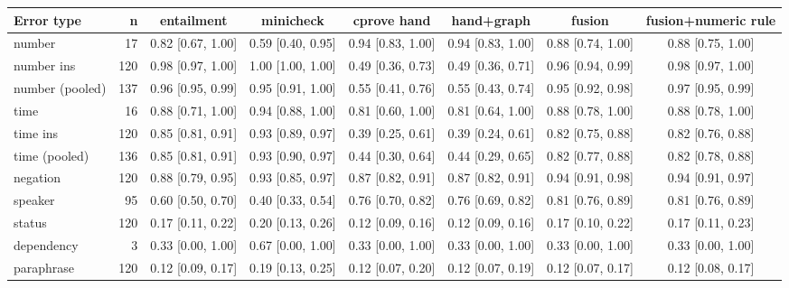 \begin{tabular}{@{}lrcccccc@{}}\toprule Error type & n & entailment & minicheck & cprove hand & hand+graph & fusion & fusion+numeric rule \\ \midrule
number & 17 & 0.82 [0.67, 1.00] & 0.59 [0.40, 0.95] & 0.94 [0.83, 1.00] & 0.94 [0.83, 1.00] & 0.88 [0.74, 1.00] & 0.88 [0.75, 1.00] \\
number ins & 120 & 0.98 [0.97, 1.00] & 1.00 [1.00, 1.00] & 0.49 [0.36, 0.73] & 0.49 [0.36, 0.71] & 0.96 [0.94, 0.99] & 0.98 [0.97, 1.00] \\
number (pooled) & 137 & 0.96 [0.95, 0.99] & 0.95 [0.91, 1.00] & 0.55 [0.41, 0.76] & 0.55 [0.43, 0.74] & 0.95 [0.92, 0.98] & 0.97 [0.95, 0.99] \\
time & 16 & 0.88 [0.71, 1.00] & 0.94 [0.88, 1.00] & 0.81 [0.60, 1.00] & 0.81 [0.64, 1.00] & 0.88 [0.78, 1.00] & 0.88 [0.78, 1.00] \\
time ins & 120 & 0.85 [0.81, 0.91] & 0.93 [0.89, 0.97] & 0.39 [0.25, 0.61] & 0.39 [0.24, 0.61] & 0.82 [0.75, 0.88] & 0.82 [0.76, 0.88] \\
time (pooled) & 136 & 0.85 [0.81, 0.91] & 0.93 [0.90, 0.97] & 0.44 [0.30, 0.64] & 0.44 [0.29, 0.65] & 0.82 [0.77, 0.88] & 0.82 [0.78, 0.88] \\
negation & 120 & 0.88 [0.79, 0.95] & 0.93 [0.85, 0.97] & 0.87 [0.82, 0.91] & 0.87 [0.82, 0.91] & 0.94 [0.91, 0.98] & 0.94 [0.91, 0.97] \\
speaker & 95 & 0.60 [0.50, 0.70] & 0.40 [0.33, 0.54] & 0.76 [0.70, 0.82] & 0.76 [0.69, 0.82] & 0.81 [0.76, 0.89] & 0.81 [0.76, 0.89] \\
status & 120 & 0.17 [0.11, 0.22] & 0.20 [0.13, 0.26] & 0.12 [0.09, 0.16] & 0.12 [0.09, 0.16] & 0.17 [0.10, 0.22] & 0.17 [0.11, 0.23] \\
dependency & 3 & 0.33 [0.00, 1.00] & 0.67 [0.00, 1.00] & 0.33 [0.00, 1.00] & 0.33 [0.00, 1.00] & 0.33 [0.00, 1.00] & 0.33 [0.00, 1.00] \\
paraphrase & 120 & 0.12 [0.09, 0.17] & 0.19 [0.13, 0.25] & 0.12 [0.07, 0.20] & 0.12 [0.07, 0.19] & 0.12 [0.07, 0.17] & 0.12 [0.08, 0.17] \\
\bottomrule\end{tabular}